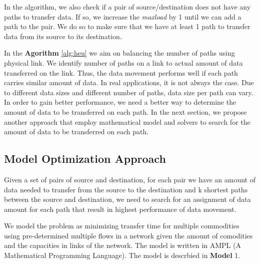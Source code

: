 In the algorithm, we also check if a pair of source/destination does not have any paths to transfer data. If so, we increase the \textit{maxload} by 1 until we can add a path to the pair. We do so to make sure that we have at least 1 path to transfer data from its source to its destination.

In the \textbf{Agorithm} \ref{alg:heu} we aim on balancing the number of paths using physical link. We identify number of paths on a link to actual amount of data transferred on the link.  Thus, the data movement performs well if each path carries similar amount of data. In real applications, it is not always the case. Due to different data sizes and different number of paths, data size per path can vary. In order to gain better performance, we need a better way to determine the amount of data to be transferred on each path. In the next section, we propose another approach that employ mathematical model and solvers to search for the amount of data to be transferred on each path. 

\subsection{Model Optimization Approach}

Given a set of pairs of source and destination, for each pair we have an amount of data needed to transfer from the source to the destination and k shortest paths between the source and destination, we need to search for an assignment of data amount for each path that result in highest performance of data movement.

We model the problem as minimizing transfer time for multiple commodities using pre-determined multiple flows in a network given the amount of comodities and the capacities in links of the network. The model is written in AMPL (A Mathematical Programming Language). The model is descrbied in \textbf{Model} 1.

